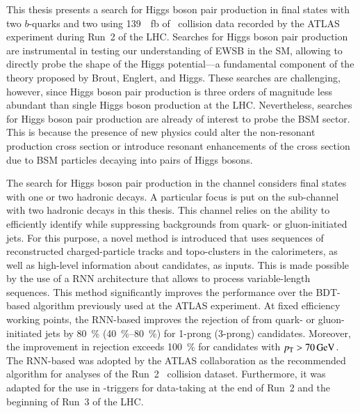 This thesis presents a search for Higgs boson pair production in final states
with two $b$-quarks and two \tauleptons using \SI{139}{\per\femto\barn} of
\pp~collision data recorded by the ATLAS experiment during Run~2 of the
LHC. Searches for Higgs boson pair production are instrumental in testing our
understanding of EWSB in the SM, allowing to directly probe the shape of the
Higgs potential---a fundamental component of the theory proposed by Brout,
Englert, and Higgs. These searches are challenging, however, since Higgs boson
pair production is three orders of magnitude less abundant than single Higgs
boson production at the LHC. Nevertheless, searches for Higgs boson pair
production are already of interest to probe the BSM sector. This is because the
presence of new physics could alter the non-resonant \HH production cross
section or introduce resonant enhancements of the cross section due to BSM
particles decaying into pairs of Higgs bosons.


The search for Higgs boson pair production in the \bbtautau channel considers
final states with one or two hadronic \taulepton decays. A particular focus is
put on the sub-channel with two hadronic \taulepton decays in this thesis. This
channel relies on the ability to efficiently identify \tauhadvis while
suppressing backgrounds from quark- or gluon-initiated jets. For this purpose, a
novel \tauid method is introduced that uses sequences of reconstructed
charged-particle tracks and topo-clusters in the calorimeters, as well as
high-level information about \tauhadvis candidates, as inputs. This is made
possible by the use of a RNN architecture that allows to process variable-length
sequences. This method significantly improves the \tauid performance over the
BDT-based algorithm previously used at the ATLAS experiment. At fixed \tauhadvis
efficiency working points, the RNN-based \tauid improves the rejection of
\faketauhadvis from quark- or gluon-initiated jets by \SI{80}{\percent}
(\SIrange{40}{80}{\percent}) for 1-prong (3-prong) \tauhadvis
candidates. Moreover, the improvement in \faketauhadvis rejection exceeds
\SI{100}{\percent} for candidates with $\pT > \SI{70}{\GeV}$. The RNN-based
\tauid was adopted by the ATLAS collaboration as the recommended \tauid
algorithm for analyses of the Run~2 \pp~collision dataset. Furthermore, it was
adapted for the use in \tauhadvis-triggers for data-taking at the end of Run~2
and the beginning of Run~3 of the LHC.


